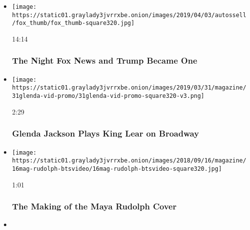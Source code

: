 \begin{itemize}
\item
  \href{https://www.nytimes3xbfgragh.onion/video/magazine/100000006349886/fox-news-trump-administration.html?action=click\&module=video-series-bar\&region=header\&pgtype=Article\&playlistId=video/magazine}{}

  \texttt{[image: https://static01.graylady3jvrrxbe.onion/images/2019/04/03/autossell/fox\_thumb/fox\_thumb-square320.jpg]}

  14:14

  \hypertarget{the-night-fox-news-and-trump-became-one}{%
  \subsubsection{The Night Fox News and Trump Became
  One}\label{the-night-fox-news-and-trump-became-one}}
\item
  \href{https://www.nytimes3xbfgragh.onion/video/magazine/100000006430808/glenda-jackson-plays-king-lear-on-broadway.html?action=click\&module=video-series-bar\&region=header\&pgtype=Article\&playlistId=video/magazine}{}

  \texttt{[image: https://static01.graylady3jvrrxbe.onion/images/2019/03/31/magazine/31glenda-vid-promo/31glenda-vid-promo-square320-v3.png]}

  2:29

  \hypertarget{glenda-jackson-plays-king-lear-on-broadway}{%
  \subsubsection{Glenda Jackson Plays King Lear on
  Broadway}\label{glenda-jackson-plays-king-lear-on-broadway}}
\item
  \href{https://www.nytimes3xbfgragh.onion/video/magazine/100000006104848/the-making-of-the-maya-rudolph-cover.html?action=click\&module=video-series-bar\&region=header\&pgtype=Article\&playlistId=video/magazine}{}

  \texttt{[image: https://static01.graylady3jvrrxbe.onion/images/2018/09/16/magazine/16mag-rudolph-btsvideo/16mag-rudolph-btsvideo-square320.jpg]}

  1:01

  \hypertarget{the-making-of-the-maya-rudolph-cover}{%
  \subsubsection{The Making of the Maya Rudolph
  Cover}\label{the-making-of-the-maya-rudolph-cover}}
\item
  \href{https://www.nytimes3xbfgragh.onion/video/magazine/100000006065275/dev-hynes-untitled-improvisation-1.html?action=click\&module=video-series-bar\&region=header\&pgtype=Article\&playlistId=video/magazine}{}


\end{itemize}
